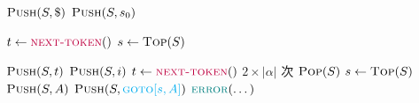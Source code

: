 
\begin{algorithm}[H]
\begin{algorithmic}[1]
    \State $\Call{Push}{S, \$}$ \qquad $\Call{Push}{S, s_{0}}$

    \hStatex
    \State $t \gets \Call{\purple{next-token}}{\null}$
      \State $s \gets \Call{Top}{S}$  

      \hStatex
       
        \State $\Call{Push}{S, t}$ \qquad $\Call{Push}{S, i}$
        \State $t \gets \Call{\purple{next-token}}{\null}$
       
        \State $2 \times |\alpha|$ 次 $\Call{Pop}{S}$
        \State $s \gets \Call{Top}{S}$  
        \State $\Call{Push}{S, A}$ \qquad $\Call{Push}{S, \cyan{\goto[s, A]}}$ 
       
      \Else
        \State $\Call{\teal{error}}{\dots}$
      \EndIf
    \EndWhile
  \EndProcedure
\end{algorithmic}
\end{algorithm}